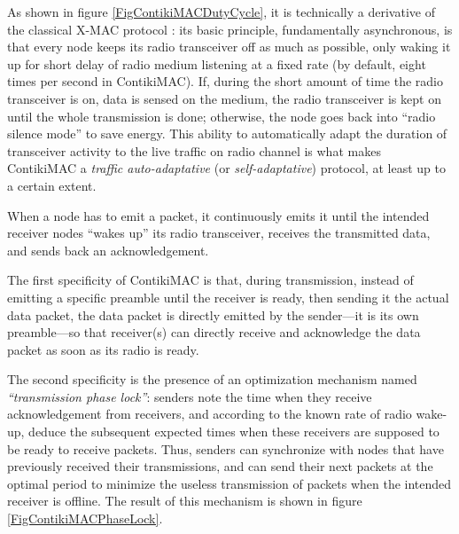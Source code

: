 \documentclass[12pt,a4paper]{article}
\begin{document}
As shown in figure \ref{FigContikiMACDutyCycle}, it is technically
a derivative of the classical X-MAC protocol \cite{XMAC}: its basic principle,
fundamentally asynchronous, is that every node keeps its radio transceiver
off as much as possible, only waking it up for short delay of radio medium
listening at a fixed rate (by default, eight times per second in ContikiMAC).
If, during the short amount of time the radio transceiver is on, data
is sensed on the medium, the radio transceiver is kept on until the whole
transmission is done; otherwise, the node goes back into ``radio silence
mode'' to save energy. This ability to automatically adapt the duration
of transceiver activity to the live traffic on radio channel is what makes
ContikiMAC a \emph{traffic auto-adaptative} (or \emph{self-adaptative})
protocol, at least up to a certain extent.

When a node has to emit a packet, it continuously emits it until the
intended receiver nodes ``wakes up'' its radio transceiver, receives
the transmitted data, and sends back an acknowledgement.

The first specificity of ContikiMAC is that, during transmission, instead
of emitting a specific preamble until the receiver is ready, then sending
it the actual data packet, the data packet is directly emitted by the
sender---it is its own preamble---so that receiver(s) can directly receive
and acknowledge the data packet as soon as its radio is ready.

The second specificity is the presence of an optimization mechanism named
\emph{``transmission phase lock''}: senders note the time when they receive
acknowledgement from receivers, and according to the known rate of radio
wake-up, deduce the subsequent expected times when these receivers are
supposed to be ready to receive packets. Thus, senders can synchronize
with nodes that have previously received their transmissions, and can
send their next packets at the optimal period to minimize the useless
transmission of packets when the intended receiver is offline. The
result of this mechanism is shown in figure \ref{FigContikiMACPhaseLock}.
\end{document}
